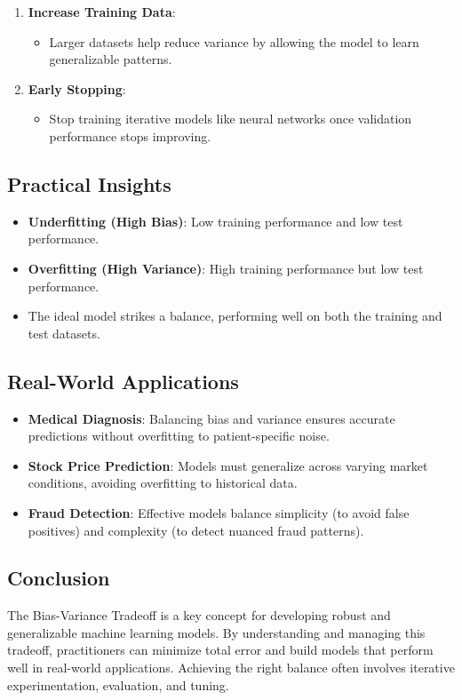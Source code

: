 \begin{enumerate}
    \item \textbf{Increase Training Data}:
    \begin{itemize}
        \item Larger datasets help reduce variance by allowing the model to learn generalizable patterns.
    \end{itemize}

    \item \textbf{Early Stopping}:
    \begin{itemize}
        \item Stop training iterative models like neural networks once validation performance stops improving.
    \end{itemize}
\end{enumerate}

\subsection*{Practical Insights}
\begin{itemize}
    \item \textbf{Underfitting (High Bias)}: Low training performance and low test performance.
    \item \textbf{Overfitting (High Variance)}: High training performance but low test performance.
    \item The ideal model strikes a balance, performing well on both the training and test datasets.
\end{itemize}

\subsection*{Real-World Applications}
\begin{itemize}
    \item \textbf{Medical Diagnosis}: Balancing bias and variance ensures accurate predictions without overfitting to patient-specific noise.
    \item \textbf{Stock Price Prediction}: Models must generalize across varying market conditions, avoiding overfitting to historical data.
    \item \textbf{Fraud Detection}: Effective models balance simplicity (to avoid false positives) and complexity (to detect nuanced fraud patterns).
\end{itemize}

\subsection*{Conclusion}
The Bias-Variance Tradeoff is a key concept for developing robust and generalizable machine learning models. By understanding and managing this tradeoff, practitioners can minimize total error and build models that perform well in real-world applications. Achieving the right balance often involves iterative experimentation, evaluation, and tuning.
